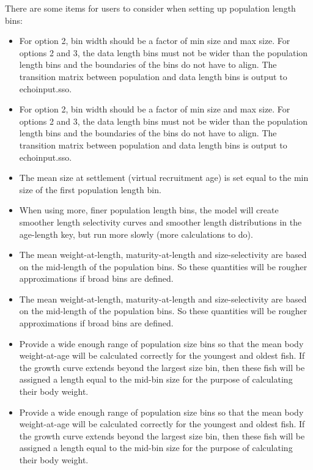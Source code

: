 There are some items for users to consider when setting up population length bins:
\begin{itemize}
	\item For option 2, bin width should be a factor of min size and max size. For options 2 and 3, the data length bins must not be wider than the population length bins and the boundaries of the bins do not have to align. The transition matrix between population and data length bins is output to echoinput.sso.
	\item For option 2, bin width should be a factor of min size and max size. For options 2 and 3, the data length bins must not be wider than the population length bins and the boundaries of the bins do not have to align. The transition matrix between population and data length bins is output to echoinput.sso.
	
	\item The mean size at settlement (virtual recruitment age) is set equal to the min size of the first population length bin.
	
	\item When using more, finer population length bins, the model will create smoother length selectivity curves and smoother length distributions in the age-length key, but run more slowly (more calculations to do).
	
	\item The mean weight-at-length, maturity-at-length and size-selectivity are based on the mid-length of the population bins. So these quantities will be rougher approximations if broad bins are defined.
	\item The mean weight-at-length, maturity-at-length and size-selectivity are based on the mid-length of the population bins. So these quantities will be rougher approximations if broad bins are defined.
	
	\item Provide a wide enough range of population size bins so that the mean body weight-at-age will be calculated correctly for the youngest and oldest fish. If the growth curve extends beyond the largest size bin, then these fish will be assigned a length equal to the mid-bin size for the purpose of calculating their body weight.
	\item Provide a wide enough range of population size bins so that the mean body weight-at-age will be calculated correctly for the youngest and oldest fish. If the growth curve extends beyond the largest size bin, then these fish will be assigned a length equal to the mid-bin size for the purpose of calculating their body weight.
	

\end{itemize}
